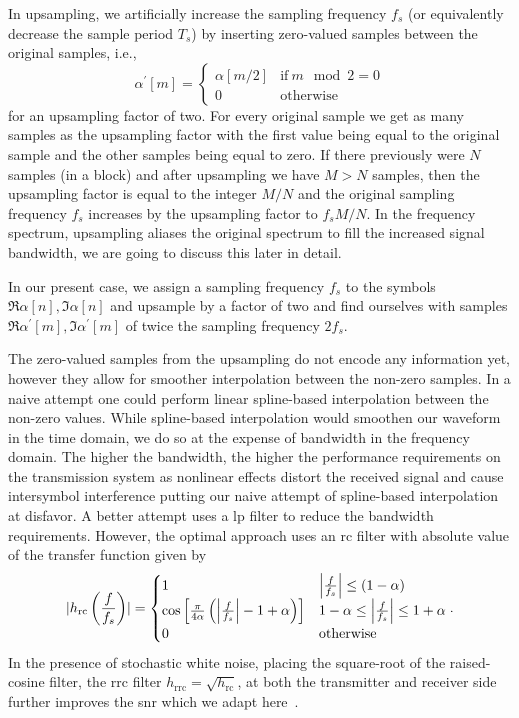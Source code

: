 In upsampling, we artificially increase the sampling frequency $f_s$ (or equivalently decrease the sample period $T_s$) by inserting zero-valued samples between the original samples, i.e.,
\begin{equation}
	\alpha^\prime[m]
	=
	\begin{cases}
		\alpha[m/2] & \text{if}\ m\mod2=0 \\
		0 & \text{otherwise}
	\end{cases}
\end{equation}
for an upsampling factor of two.
For every original sample we get as many samples as the upsampling factor with the first value being equal to the original sample and the other samples being equal to zero.
If there previously were $N$ samples (in a block) and after upsampling we have $M>N$ samples, then the upsampling factor is equal to the integer $M/N$ and the original sampling frequency $f_s$ increases by the upsampling factor to $f_sM/N$.
In the frequency spectrum, upsampling aliases the original spectrum to fill the increased signal bandwidth, we are going to discuss this later in detail.

In our present case, we assign a sampling frequency $f_s$ to the symbols $\Re\alpha[n],\Im\alpha[n]$ and upsample by a factor of two and find ourselves with samples $\Re\alpha^\prime[m],\Im\alpha^\prime[m]$ of twice the sampling frequency $2f_s$.

The zero-valued samples from the upsampling do not encode any information yet, however they allow for smoother interpolation between the non-zero samples.
In a naive attempt one could perform linear spline-based interpolation between the non-zero values.
While spline-based interpolation would smoothen our waveform in the time domain, we do so at the expense of bandwidth in the frequency domain.
The higher the bandwidth, the higher the performance requirements on the transmission system as nonlinear effects distort the received signal and cause intersymbol interference putting our naive attempt of spline-based interpolation at disfavor.
A better attempt uses a \gls{lp} filter to reduce the bandwidth requirements.
However, the optimal approach uses an \gls{rc} filter with absolute value of the transfer function given by~\cite[p.~33]{Nossek2015}
\begin{equation}
	\abs{h_\text{rc}\left(\frac{f}{f_s}\right)}
	=
	\begin{cases}
		1 & \abs*{\frac{f}{f_s}}\leq(1-\alpha) \\
		\cos\left[\frac{\pi}{4\alpha}\left(\abs*{\frac{f}{f_s}}-1+\alpha\right)\right] & 1-\alpha\leq\abs*{\frac{f}{f_s}}\leq1+\alpha \\
		0 & \text{otherwise}
	\end{cases}
	.
\end{equation}
In the presence of stochastic white noise, placing the square-root of the raised-cosine filter, the \gls{rrc} filter $h_\text{rrc}=\sqrt{h_\text{rc}}$, at both the transmitter and receiver side further improves the \gls{snr} which we adapt here~\cite{Cubukcu2012}.

